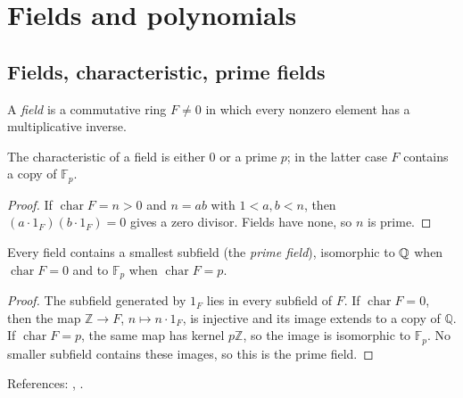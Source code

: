 \section{Fields and polynomials}\label{sec:fields-polynomials}

\subsection{Fields, characteristic, prime fields}
\begin{definition}
A \emph{field} is a commutative ring $F\neq 0$ in which every nonzero element has a multiplicative inverse.
\end{definition}
\begin{proposition}[Characteristic]\label{prop:char}
The characteristic of a field is either $0$ or a prime $p$; in the latter case $F$ contains a copy of $\mathbb{F}_p$.
\end{proposition}
\begin{proof}
If $\operatorname{char}F=n>0$ and $n=ab$ with $1<a,b<n$, then $(a\cdot1_F)(b\cdot1_F)=0$ gives a zero divisor. Fields have none, so $n$ is prime.
\end{proof}
\begin{proposition}
Every field contains a smallest subfield (the \emph{prime field}), isomorphic to $\mathbb{Q}$ when $\operatorname{char}F=0$ and to $\mathbb{F}_p$ when $\operatorname{char}F=p$.
\end{proposition}
\begin{proof}
The subfield generated by $1_F$ lies in every subfield of $F$. If $\operatorname{char}F=0$, then the map $\mathbb{Z}\to F$, $n\mapsto n\cdot1_F$, is injective and its image extends to a copy of $\mathbb{Q}$. If $\operatorname{char}F=p$, the same map has kernel $p\mathbb{Z}$, so the image is isomorphic to $\mathbb{F}_p$. No smaller subfield contains these images, so this is the prime field.
\end{proof}
References: \cite[\S13]{DF}, \cite[Ch.~I]{Artin}.

